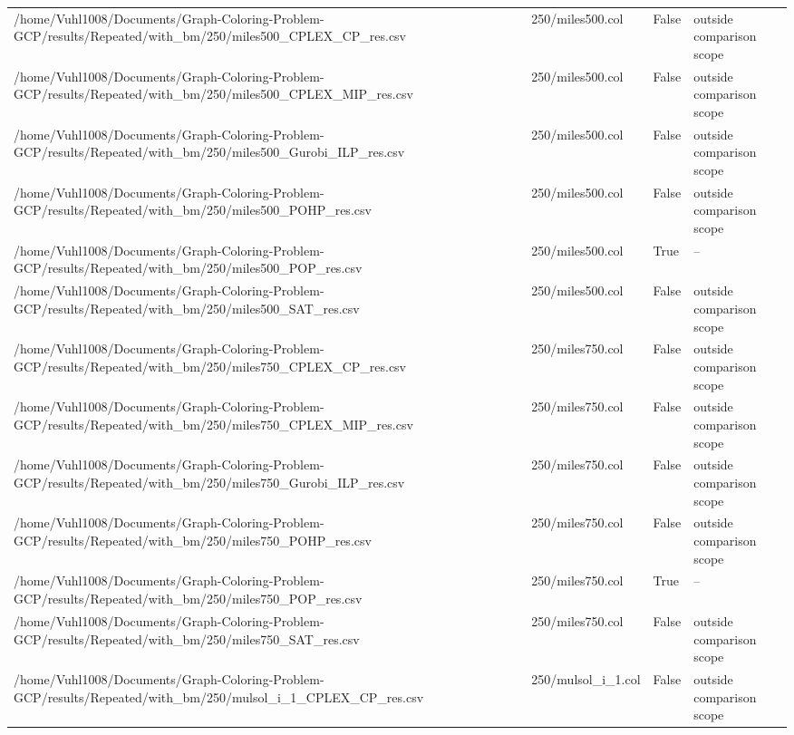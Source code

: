 \begin{table}[htbp]
\begin{tabular}{llll}
/home/Vuhl1008/Documents/Graph-Coloring-Problem-GCP/results/Repeated/with\_bm/250/miles500\_CPLEX\_CP\_res.csv & 250/miles500.col & False & outside comparison scope \\
/home/Vuhl1008/Documents/Graph-Coloring-Problem-GCP/results/Repeated/with\_bm/250/miles500\_CPLEX\_MIP\_res.csv & 250/miles500.col & False & outside comparison scope \\
/home/Vuhl1008/Documents/Graph-Coloring-Problem-GCP/results/Repeated/with\_bm/250/miles500\_Gurobi\_ILP\_res.csv & 250/miles500.col & False & outside comparison scope \\
/home/Vuhl1008/Documents/Graph-Coloring-Problem-GCP/results/Repeated/with\_bm/250/miles500\_POHP\_res.csv & 250/miles500.col & False & outside comparison scope \\
/home/Vuhl1008/Documents/Graph-Coloring-Problem-GCP/results/Repeated/with\_bm/250/miles500\_POP\_res.csv & 250/miles500.col & True & -- \\
/home/Vuhl1008/Documents/Graph-Coloring-Problem-GCP/results/Repeated/with\_bm/250/miles500\_SAT\_res.csv & 250/miles500.col & False & outside comparison scope \\
/home/Vuhl1008/Documents/Graph-Coloring-Problem-GCP/results/Repeated/with\_bm/250/miles750\_CPLEX\_CP\_res.csv & 250/miles750.col & False & outside comparison scope \\
/home/Vuhl1008/Documents/Graph-Coloring-Problem-GCP/results/Repeated/with\_bm/250/miles750\_CPLEX\_MIP\_res.csv & 250/miles750.col & False & outside comparison scope \\
/home/Vuhl1008/Documents/Graph-Coloring-Problem-GCP/results/Repeated/with\_bm/250/miles750\_Gurobi\_ILP\_res.csv & 250/miles750.col & False & outside comparison scope \\
/home/Vuhl1008/Documents/Graph-Coloring-Problem-GCP/results/Repeated/with\_bm/250/miles750\_POHP\_res.csv & 250/miles750.col & False & outside comparison scope \\
/home/Vuhl1008/Documents/Graph-Coloring-Problem-GCP/results/Repeated/with\_bm/250/miles750\_POP\_res.csv & 250/miles750.col & True & -- \\
/home/Vuhl1008/Documents/Graph-Coloring-Problem-GCP/results/Repeated/with\_bm/250/miles750\_SAT\_res.csv & 250/miles750.col & False & outside comparison scope \\
/home/Vuhl1008/Documents/Graph-Coloring-Problem-GCP/results/Repeated/with\_bm/250/mulsol\_i\_1\_CPLEX\_CP\_res.csv & 250/mulsol\_i\_1.col & False & outside comparison scope \\

\end{tabular}
\end{table}

